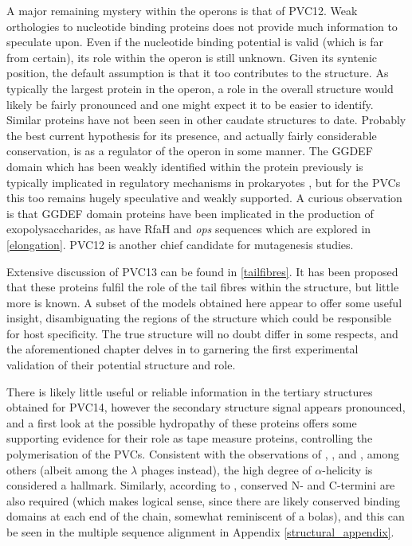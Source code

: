 A major remaining mystery within the operons is that of PVC12. Weak orthologies to nucleotide binding proteins does not provide much information to speculate upon. Even if the nucleotide binding potential is valid (which is far from certain), its role within the operon is still unknown. Given its syntenic position, the default assumption is that it too contributes to the structure. As typically the largest protein in the operon, a role in the overall structure would likely be fairly pronounced and one might expect it to be easier to identify. Similar proteins have not been seen in other caudate structures to date. Probably the best current hypothesis for its presence, and actually fairly considerable conservation, is as a regulator of the operon in some manner. The GGDEF domain which has been weakly identified within the protein previously is typically implicated in regulatory mechanisms in prokaryotes \citep{Paul2004, Ryjenkov2005}, but for the PVCs this too remains hugely speculative and weakly supported. A curious observation is that GGDEF domain proteins have been implicated in the production of exopolysaccharides, as have RfaH and \emph{ops} sequences which are explored in \vref{elongation}. PVC12 is another chief candidate for mutagenesis studies.

Extensive discussion of PVC13 can be found in \vref{tailfibres}. It has been proposed that these proteins fulfil the role of the tail fibres within the structure, but little more is known. A subset of the models obtained here appear to offer some useful insight, disambiguating the regions of the structure which could be responsible for host specificity. The true structure will no doubt differ in some respects, and the aforementioned chapter delves in to garnering the first experimental validation of their potential structure and role.

There is likely little useful or reliable information in the tertiary structures obtained for PVC14, however the secondary structure signal appears pronounced, and a first look at the possible hydropathy of these proteins offers some supporting evidence for their role as tape measure proteins, controlling the polymerisation of the PVCs. Consistent with the observations of \cite{Rybakova2015}, \cite{Mahony2016}, and \cite{Katsura1984}, among others (albeit among the $\lambda$ phages instead), the high degree of $\alpha$-helicity is considered a hallmark. Similarly, according to \cite{Mahony2016}, conserved N- and C-termini are also required (which makes logical sense, since there are likely conserved binding domains at each end of the chain, somewhat reminiscent of a bolas), and this can be seen in the multiple sequence alignment in Appendix \vref{structural_appendix}.


